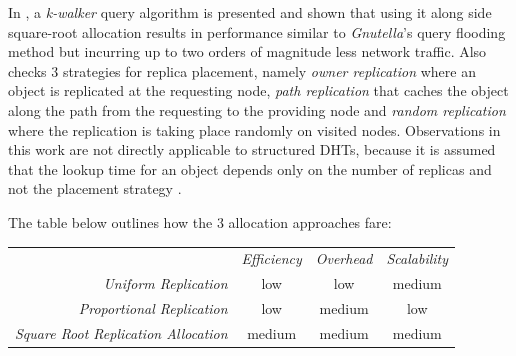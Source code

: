 In \cite{LCCLS2002}, a \emph{k-walker} query algorithm is presented and shown
that using it along side square-root allocation results in performance similar to
{\sl Gnutella}'s query flooding method but incurring up to two
orders of magnitude less network traffic. Also checks $3$ strategies for
replica placement, namely \emph{owner replication} where an object is replicated
at the requesting node, \emph{path replication} that caches the object along the
path from the requesting to the providing node and \emph{random replication}
where the replication is taking place randomly on visited nodes. Observations in
this work are not directly applicable to structured DHTs, because it is assumed
that the lookup time for an object depends only on the number of replicas and
not the placement strategy \cite{RS2004}.


The table below outlines how the $3$ allocation approaches fare:
\begin{center}
{\footnotesize
\begin{tabular}{rccc}
\multicolumn{1}{r}{} &
\multicolumn{1}{c}{\emph{Efficiency}} &
\multicolumn{1}{c}{\emph{Overhead}} &
\multicolumn{1}{c}{\emph{Scalability}}
\\
\cline{2-4}
\emph{Uniform Replication} &
low &
low &
%
medium \\
\emph{Proportional Replication} &
low &
medium &
%
low \\
\emph{Square Root Replication Allocation} &
medium &
medium &
medium \\
\end{tabular}
}
\end{center}

